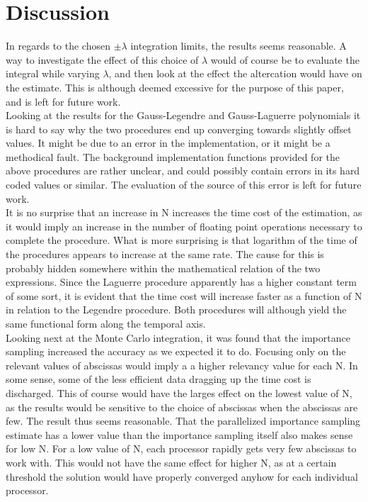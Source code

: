 \documentclass[%
reprint,
amsmath,amssymb,
aps,
]{revtex4-1}
\begin{document}
\section{Discussion} \noindent 
In regards to the chosen $\pm \lambda$ integration limits, the results seems reasonable. A way to investigate the effect of this choice of $\lambda$ would of course be to evaluate the integral while varying $\lambda$, and then look at the effect the altercation would have on the estimate. This is although deemed excessive for the purpose of this paper, and is left for future work. \\ \indent 
Looking at the results for the Gauss-Legendre and Gauss-Laguerre polynomials it is hard to say why the two procedures end up converging towards slightly offset values. It might be due to an error in the implementation, or it might be a methodical fault.  The background implementation functions provided for the above procedures are rather unclear, and could possibly contain errors in its hard coded values or similar. The evaluation of the source of this error is left for future work. \\ \indent 
It is no surprise that an increase in N increases the time cost of the estimation, as it would imply an increase in the number of floating point operations necessary to complete the procedure. What is more surprising is that logarithm of the time of the procedures appears to increase at the same rate. The cause for this is probably hidden somewhere within the mathematical relation of the two expressions. Since the Laguerre procedure apparently has a higher constant term of some sort, it is evident that the time cost will increase faster as a function of N in relation to the Legendre procedure. Both procedures will although yield the same functional form along the temporal axis. \\ \indent 
Looking next at the Monte Carlo integration, it was found that the importance sampling increased the accuracy as we expected it to do. Focusing only on the relevant values of abscissas would imply a a higher relevancy value for each N. In some sense, some of the less efficient data dragging up the time cost is discharged. This of course would have the larges effect on the lowest value of N, as the results would be sensitive to the choice of abscissas when the abscissas are few. The result thus seems reasonable. That the parallelized importance sampling estimate has a lower value than the importance sampling itself also makes sense for low N. For a low value of N, each processor rapidly gets very few abscissas to work with. This would not have the same effect for higher N, as at a certain threshold the solution would have properly converged anyhow for each individual processor. \\ \indent 
\end{document}
